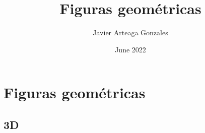 \documentclass{article}
\title{Figuras geométricas}
\author{Javier Arteaga Gonzales}
\date{June 2022}
\begin{document}
\maketitle
\section{Figuras geométricas}
\subsection{3D}
%
%
%
%
%
%
%


\end{document}
